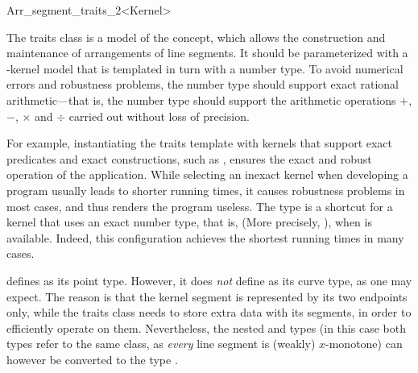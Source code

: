 
\ccRefPageBegin

\begin{ccRefClass}{Arr_segment_traits_2<Kernel>}
    
\ccDefinition 

The traits class \ccRefName{} is a model of the 
concept, which allows the construction and maintenance of arrangements of
line segments. It should be parameterized with a \cgal-kernel model that is
templated in turn with a number type. To avoid numerical errors and
robustness problems, the number type should support exact rational
arithmetic---that is, the number type should support the arithmetic
operations $+$, $-$, $\times$ and $\div$ carried out without loss of
precision.

For example, instantiating the traits template with kernels that support
exact predicates and exact constructions, such as
, ensures the exact and
robust operation of the application. While selecting an inexact kernel when
developing a program usually leads to shorter running times, it causes
robustness problems in most cases, and thus renders the program useless. The
 type is a shortcut for a
kernel that uses an exact number type, that is,  (More
precisely, ), when  is available.
Indeed, this configuration achieves the shortest running times in many cases.

\ccRefName{} defines  as its point type. However, it
does {\sl not} define  as its curve type, as one
may expect. The reason is that the kernel segment is represented by its
two endpoints only, while the traits class needs to store extra data
with its segments, in order to efficiently operate on them. Nevertheless,
the nested  and  types (in this
case both types refer to the same class, as {\sl every} line segment
is (weakly) $x$-monotone) can however be converted to the type
.


\end{ccRefClass}
